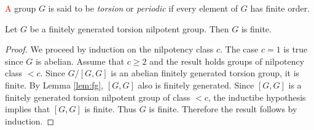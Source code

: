  \textcolor{red}{A} group $G$ is said to be {\em torsion} or {\em periodic} if every element of $G$ has finite order.


\begin{theorem}
	\label{thm:T(G)finito}
	Let $G$ be a finitely generated torsion nilpotent group. Then
	$G$ is finite.  	
\end{theorem}

\begin{proof}
	We proceed by induction on the nilpotency class $c$. The case $c=1$ is true since $G$ is abelian. Assume 
	that $c\geq 2$ and the result holds groups of nilpotency class $<c$.  Since $G/[G,G]$ is an abelian finitely generated torsion group, it is finite. By Lemma \ref{lem:fg}, $[G,G]$ also is finitely generated. Since $[G,G]$ is a finitely generated torsion nilpotent group of class $<c$, the inductibe hypothesis implies that $[G,G]$ is finite. Thus $G$
	is finite. Therefore the result follows by induction.
\end{proof}

%

